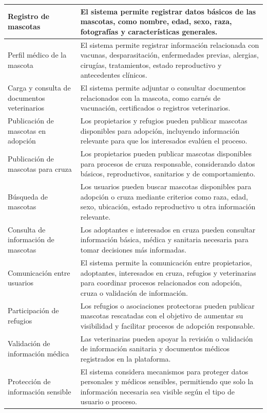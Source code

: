 \documentclass[journal,onecolumn]{IEEEtran}
\begin{document}
\begin{longtable}{|p{4cm}|p{11cm}|}
		Registro de mascotas & El sistema permite registrar datos básicos de las mascotas, como nombre, edad, sexo, raza, fotografías y características generales. \\
		\hline
		Perfil médico de la mascota & El sistema permite registrar información relacionada con vacunas, desparasitación, enfermedades previas, alergias, cirugías, tratamientos, estado reproductivo y antecedentes clínicos. \\
		\hline
		Carga y consulta de documentos veterinarios & El sistema permite adjuntar o consultar documentos relacionados con la mascota, como carnés de vacunación, certificados o registros veterinarios. \\
		\hline
		Publicación de mascotas en adopción & Los propietarios y refugios pueden publicar mascotas disponibles para adopción, incluyendo información relevante para que los interesados evalúen el proceso. \\
		\hline
		Publicación de mascotas para cruza & Los propietarios pueden publicar mascotas disponibles para procesos de cruza responsable, considerando datos básicos, reproductivos, sanitarios y de comportamiento. \\
		\hline
		Búsqueda de mascotas & Los usuarios pueden buscar mascotas disponibles para adopción o cruza mediante criterios como raza, edad, sexo, ubicación, estado reproductivo u otra información relevante. \\
		\hline
		Consulta de información de mascotas & Los adoptantes e interesados en cruza pueden consultar información básica, médica y sanitaria necesaria para tomar decisiones más informadas. \\
		\hline
		Comunicación entre usuarios & El sistema permite la comunicación entre propietarios, adoptantes, interesados en cruza, refugios y veterinarias para coordinar procesos relacionados con adopción, cruza o validación de información. \\
		\hline
		Participación de refugios & Los refugios o asociaciones protectoras pueden publicar mascotas rescatadas con el objetivo de aumentar su visibilidad y facilitar procesos de adopción responsable. \\
		\hline
		Validación de información médica & Las veterinarias pueden apoyar la revisión o validación de información sanitaria y documentos médicos registrados en la plataforma. \\
		\hline
		Protección de información sensible & El sistema considera mecanismos para proteger datos personales y médicos sensibles, permitiendo que solo la información necesaria sea visible según el tipo de usuario o proceso. \\

\end{longtable}
\end{document}
